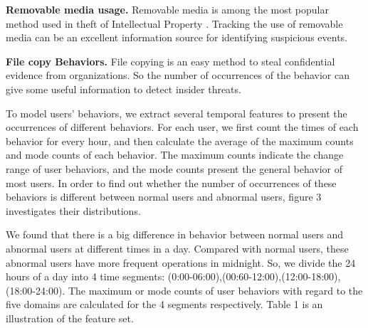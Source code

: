 \documentclass[conference]{IEEEtran}
\begin{document}
\noindent \textbf{Removable media usage.}
Removable media is among the most popular method used in theft of Intellectual Property  \cite{b18}. Tracking the use of removable media can be an excellent information source for identifying suspicious events.

\noindent \textbf{File copy Behaviors.}
File copying is an easy method to steal confidential evidence from organizations. So the number of occurrences of the behavior can give some useful information to detect insider threats. 

To model users' behaviors, we extract several temporal features to present the occurrences of different behaviors. For each user, we first count the times of each behavior for every hour, and then calculate the average of the maximum counts and mode counts of each behavior. The maximum counts indicate the change range of user behaviors, and the mode counts present the general behavior of most users. 
In order to find out whether the number of occurrences of these behaviors is different between normal users and abnormal users, figure 3 investigates their distributions.

We found that there is a big difference in behavior between normal users and abnormal users at different times in a day. Compared with normal users, these abnormal users have more frequent operations in midnight. So, we divide the 24 hours of a day into 4 time segments: (0:00-06:00),(00:60-12:00),(12:00-18:00),(18:00-24:00). The maximum or mode counts of user behaviors with regard to the five domains are calculated for the 4 segments respectively. Table 1 is an illustration of the feature set.
\end{document}
